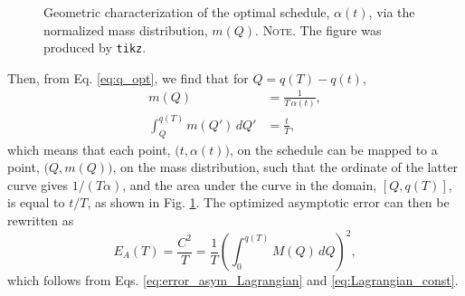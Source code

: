 \documentclass[reprint, superscriptaddress, floatfix]{revtex4-1}
\newcommand{\note}[1]{{\color{DarkGreen}\footnotesize \textsc{Note.} #1}}
\newcommand{\Err}{E}
\begin{document}
\begin{figure}[h]
\begin{center}
  \caption{
    \label{fig:massq}
    Geometric characterization of the optimal schedule,
    $\alpha(t)$,
    via the normalized mass distribution, $m(Q)$.
    \note{
      The figure was produced by \texttt{tikz}.
    }%
  }
\end{center}
\end{figure}


Then, from Eq. \eqref{eq:q_opt},
we find that for $Q = q(T) - q(t)$,
%
\begin{align}
  m(Q)
  &=
  \frac{ 1 }
       { T \, \alpha(t) }
  ,
\label{eq:mQ_invTa}
  \\
  \int_Q^{ q(T) }
    m(Q') \, dQ'
  &=
  \frac t T
  ,
\label{eq:intmQ_tT}
\end{align}
%
which means that each point,
$\bigl(t, \alpha(t)\bigr)$,
on the schedule can be mapped
to a point,
$\bigl(Q, m(Q)\bigr)$,
on the mass distribution,
such that the ordinate of the latter curve
gives $1/(T\alpha)$,
and the area under the curve in the domain, $[Q, q(T)]$,
is equal to $t/T$,
as shown in Fig. \ref{fig:massq}.
%
The optimized asymptotic error
can then be rewritten as
%
\begin{equation}
  \Err_A(T)
  =
  \frac { C^2 } { T }
  =
  \frac 1 T
  \left(
    \int_0^{ q(T) } M(Q) \, dQ
  \right)^2
  ,
\label{eq:error_asym2}
\end{equation}
%
which follows from Eqs.
\eqref{eq:error_asym_Lagrangian}
and
\eqref{eq:Lagrangian_const}.
%
\end{document}
